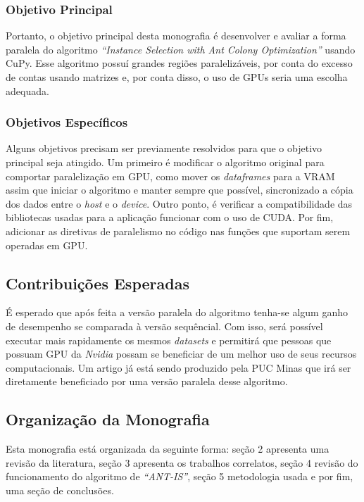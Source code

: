 \subsubsection{Objetivo Principal}

Portanto, o objetivo principal desta monografia é desenvolver e avaliar a forma paralela do algoritmo \emph{``Instance Selection with Ant Colony 
Optimization''} usando {CuPy}. Esse algoritmo possuí grandes regiões paralelizáveis, por conta do excesso de
contas usando matrizes e, por conta disso, o uso de GPUs seria uma escolha adequada.


\subsubsection{Objetivos Específicos}
Alguns objetivos precisam ser previamente resolvidos para que o objetivo principal seja atingido. Um primeiro é modificar
o algoritmo original para comportar paralelização em GPU, como mover os \emph{dataframes} para a {VRAM} assim que 
iniciar o algoritmo e manter sempre que possível, sincronizado a cópia dos dados entre o \emph{host} e o \emph{device}.
Outro ponto, é verificar a compatibilidade das bibliotecas usadas para a aplicação funcionar com o uso de {CUDA}.
Por fim, adicionar as diretivas de paralelismo no código nas funções que suportam serem operadas em GPU.

\subsection{Contribuições Esperadas}

É esperado que após feita a versão paralela do algoritmo tenha-se algum ganho de desempenho se comparada à versão
sequêncial. Com isso, será possível executar mais rapidamente os mesmos \emph{datasets} e permitirá que pessoas que
possuam GPU da \emph{Nvidia} possam se beneficiar de um melhor uso de seus recursos computacionais. Um artigo
já está sendo produzido pela PUC Minas que irá ser diretamente beneficiado por uma versão paralela desse algoritmo.

\subsection{Organização da Monografia}

Esta monografia está organizada da seguinte forma: seção 2 apresenta uma revisão da literatura, 
seção 3 apresenta os trabalhos correlatos, seção 4 revisão do funcionamento do algoritmo de
\emph{``ANT-IS''}, seção 5 metodologia usada e por fim, uma seção de conclusões.